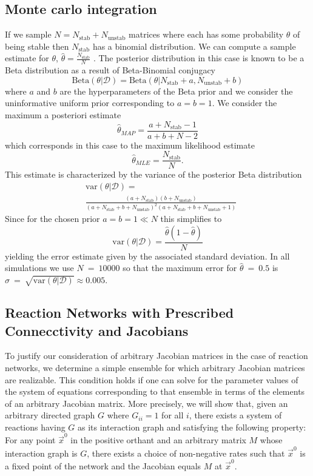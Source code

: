 \subsection{Monte carlo integration}\label{suppsec:montecarlo}
If we sample $N = N_{\mathrm{stab}} + N_{\mathrm{unstab}}$ matrices where each has some probability $\theta$ of being stable then $N_{\mathrm{stab}}$ has a binomial distribution. We can compute a sample estimate for $\theta$, $\hat{\theta} = \frac{N_{\mathrm{stab}}}{N}$ \cite{Murphy2012}. The posterior distribution in this case is known to be a Beta distribution as a result of Beta-Binomial conjugacy
$$
\mathrm{Beta}(\theta | \mathcal{D}) = \mathrm{Beta}(\theta | N_{\mathrm{stab}} + a, N_{\mathrm{unstab}} + b)
$$
where $a$ and $b$ are the hyperparameters of the Beta prior and we consider the uninformative uniform prior corresponding to $a=b=1$. We consider the maximum a posteriori estimate
$$\hat{\theta}_{MAP} = \frac{a + N_{\mathrm{stab}} - 1}{a + b + N - 2}$$
which corresponds in this case to the maximum likelihood estimate
$$
\hat{\theta}_{MLE} = \frac{N_{\mathrm{stab}}}{N}.
$$
This estimate is characterized by the variance of the posterior Beta distribution
\begin{align*}
&\mathrm{var}(\theta | \mathcal{D}) =\\
&\frac{(a+N_{\mathrm{stab}})(b+N_{\mathrm{unstab}})}{(a + N_{\mathrm{stab}} + b + N_{\mathrm{unstab}})^2(a + N_{\mathrm{stab}} + b + N_{\mathrm{unstab}}+1)}
\end{align*}
Since for the chosen prior $a=b=1 \ll N$ this simplifies to
$$
\mathrm{var}(\theta | \mathcal{D}) = \frac{\hat{\theta}(1-\hat{\theta})}{N}
$$
yielding the error estimate given by the associated standard deviation. In all simulations we use $N~=~10000$ so that the maximum error for $\hat{\theta}~=~0.5$ is $\sigma~=~\sqrt{\mathrm{var}(\theta | \mathcal{D})} \approx 0.005$.

\subsection{Reaction Networks with Prescribed Connecctivity and Jacobians}\label{sec:reactionnetjacobian}

To justify our consideration of arbitrary Jacobian matrices in the case of reaction networks, we determine a simple ensemble for which arbitrary Jacobian matrices are realizable. This condition holds if one can solve for the parameter values of the system of equations corresponding to that ensemble in terms of the elements of an arbitrary Jacobian matrix. More precisely, we will show that, given an arbitrary directed graph $G$ where $G_{ii} = 1$ for all $i$, there exists a system of reactions having $G$ as its interaction graph and satisfying the following property: For any point $\vec{x}^0$ in the positive orthant and an arbitrary matrix $M$ whose interaction graph is $G$, there exists a choice of non-negative rates such that $\vec{x}^0$ is a fixed point of the network and the Jacobian equals $M$ at $\vec{x}^0$.

